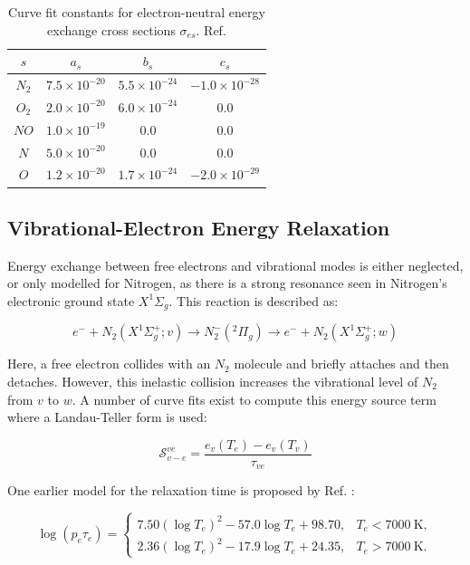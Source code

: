 \documentclass[10pt]{article}
\begin{document}
\begin{flushleft}
\begin{table}[ht]
\centering
\begin{tabular}{cccc}
\hline
$s$ & $a_s$ & $b_s$ & $c_s$ \\
\hline
$N_2$ & $7.5\times10^{-20}$ & $5.5\times10^{-24}$ & $-1.0\times10^{-28}$ \\
$O_2$ & $2.0\times10^{-20}$ & $6.0\times10^{-24}$ & $0.0$ \\
$NO$ & $1.0\times10^{-19}$ & $0.0$ & $0.0$ \\
$N$ & $5.0\times10^{-20}$ & $0.0$ & $0.0$ \\
$O$ & $1.2\times10^{-20}$ & $1.7\times10^{-24}$ & $-2.0\times10^{-29}$ \\
\hline
\end{tabular}
\caption{Curve fit constants for electron-neutral energy exchange cross sections $\sigma_{es}$. Ref. \cite{gnoffo1989}}
\label{tab:el-neut-x-sec}
\end{table}

\subsection{Vibrational-Electron Energy Relaxation}
\label{sec:vib-el-relax}

Energy exchange between free electrons and vibrational modes is either neglected, or only modelled for Nitrogen, as there is a strong resonance seen in Nitrogen's electronic ground state $X^1 \Sigma_g$. This reaction is described as:

\begin{equation*}
    e^- + N_2(X^1 \Sigma_g^+;v) \rightarrow N_2^-(^2 \Pi_g) \rightarrow e^- + N_2(X^1 \Sigma_g^+; w)
\end{equation*}

Here, a free electron collides with an $N_2$ molecule and briefly attaches and then detaches. However, this inelastic collision increases the vibrational level of $N_2$ from $v$ to $w$. A number of curve fits exist to compute this energy source term where a Landau-Teller form is used:

\begin{equation*}
    \mathcal{S}_{v-e}^{ve} = \frac{e_v(T_e) - e_v(T_v)}{\tau_{ve}}
\end{equation*}

One earlier model for the relaxation time is proposed by Ref. \cite{candler1988}:

\begin{equation}
\log\!\left(p_e \tau_e\right)=
\begin{cases}
7.50(\log T_e)^2 - 57.0\log T_e + 98.70,
& T_e < 7000~\si{\kelvin}, \\[0.5em]
2.36(\log T_e)^2 - 17.9\log T_e + 24.35,
& T_e > 7000~\si{\kelvin}.
\end{cases}
\end{equation}


\end{flushleft}
\end{document}
